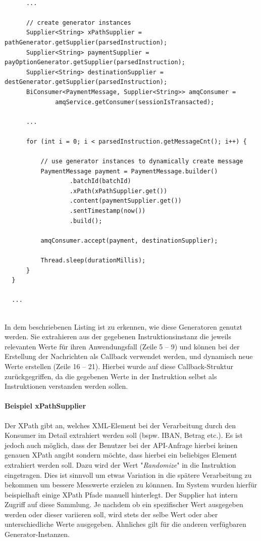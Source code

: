\begin{minipage}{\linewidth}
\begin{lstlisting}[style=javaStyle,caption={Supplier - Service},label=lst:supplierServiceImpl]
  
      ...

      // create generator instances
      Supplier<String> xPathSupplier = pathGenerator.getSupplier(parsedInstruction);
      Supplier<String> paymentSupplier = payOptionGenerator.getSupplier(parsedInstruction);
      Supplier<String> destinationSupplier = destGenerator.getSupplier(parsedInstruction);
      BiConsumer<PaymentMessage, Supplier<String>> amqConsumer =
              amqService.getConsumer(sessionIsTransacted);

      ...

      for (int i = 0; i < parsedInstruction.getMessageCnt(); i++) {

          // use generator instances to dynamically create message
          PaymentMessage payment = PaymentMessage.builder()
                  .batchId(batchId)
                  .xPath(xPathSupplier.get())
                  .content(paymentSupplier.get())
                  .sentTimestamp(now())
                  .build();

          amqConsumer.accept(payment, destinationSupplier);

          Thread.sleep(durationMillis);
      }
  }

  ...
  
\end{lstlisting}
\end{minipage}

In dem beschriebenen Listing ist zu erkennen, wie diese Generatoren genutzt werden. Sie extrahieren aus der gegebenen Instruktionsinstanz die jeweils relevanten Werte für ihren Anwendungsfall (Zeile 5 -- 9) und können bei der Erstellung der Nachrichten als Callback verwendet werden, und dynamisch neue Werte erstellen (Zeile 16 -- 21). Hierbei wurde auf diese Callback-Struktur zurückgegriffen, da die gegebenen Werte in der Instruktion selbst als Instruktionen verstanden werden sollen.

\paragraph{Beispiel xPathSupplier} 
Der XPath gibt an, welches XML-Element bei der Verarbeitung durch den Konsumer im Detail extrahiert werden soll (bspw. IBAN, Betrag etc.). Es ist jedoch auch möglich, dass der Benutzer bei der API-Anfrage hierbei keinen genauen XPath angibt sondern möchte, dass hierbei ein beliebiges Element extrahiert werden soll. Dazu wird der Wert "\emph{Randomize}" in die Instruktion eingetragen. Dies ist sinnvoll um etwas Variation in die spätere Verarbeitung zu bekommen um bessere Messwerte erzielen zu könnnen. Im System wurden hierfür beispielhaft einige XPath Pfade manuell hinterlegt. Der Supplier hat intern Zugriff auf diese Sammlung. Je nachdem ob ein spezifischer Wert ausgegeben werden oder dieser variieren soll, wird stets der selbe Wert oder aber unterschiedliche Werte ausgegeben. Ähnliches gilt für die anderen verfügbaren Generator-Instanzen.

